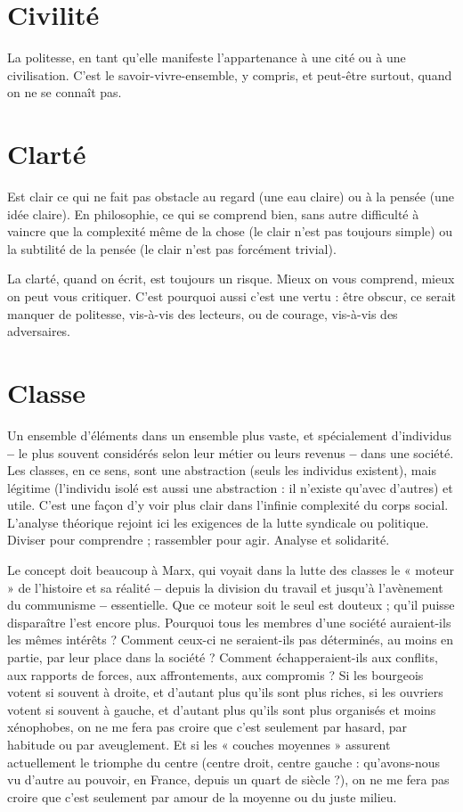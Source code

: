 \section{Civilité}
La politesse, en tant qu’elle manifeste l’appartenance à une cité
ou à une civilisation. C’est le savoir-vivre-ensemble, y compris,
et peut-être surtout, quand on ne se connaît pas.

\section{Clarté}
Est clair ce qui ne fait pas obstacle au regard (une eau claire) ou à
la pensée (une idée claire). En philosophie, ce qui se comprend
bien, sans autre difficulté à vaincre que la complexité même de la chose (le clair
n’est pas toujours simple) ou la subtilité de la pensée (le clair n’est pas forcément trivial).

La clarté, quand on écrit, est toujours un risque. Mieux on vous comprend,
mieux on peut vous critiquer. C’est pourquoi aussi c’est une vertu : être obscur,
ce serait manquer de politesse, vis-à-vis des lecteurs, ou de courage, vis-à-vis des
adversaires.

\section{Classe}
Un ensemble d’éléments dans un ensemble plus vaste, et spécialement
d’individus {\bf --} le plus souvent considérés selon leur métier ou
leurs revenus {\bf --} dans une société. Les classes, en ce sens, sont une abstraction
(seuls les individus existent), mais légitime (l'individu isolé est aussi une
abstraction : il n’existe qu'avec d’autres) et utile. C’est une façon d’y voir plus
clair dans l’infinie complexité du corps social. L'analyse théorique rejoint ici les
exigences de la lutte syndicale ou politique. Diviser pour comprendre ; rassembler
pour agir. Analyse et solidarité.

Le concept doit beaucoup à Marx, qui voyait dans la lutte des classes le
« moteur » de l’histoire et sa réalité {\bf --} depuis la division du travail et jusqu’à
l'avènement du communisme {\bf --} essentielle. Que ce moteur soit le seul est
douteux ; qu’il puisse disparaître l’est encore plus. Pourquoi tous les membres
d’une société auraient-ils les mêmes intérêts ? Comment ceux-ci ne seraient-ils
pas déterminés, au moins en partie, par leur place dans la société ? Comment
échapperaient-ils aux conflits, aux rapports de forces, aux affrontements, aux
compromis ? Si les bourgeois votent si souvent à droite, et d’autant plus qu’ils
sont plus riches, si les ouvriers votent si souvent à gauche, et d’autant plus
qu’ils sont plus organisés et moins xénophobes, on ne me fera pas croire que
c’est seulement par hasard, par habitude ou par aveuglement. Et si les « couches
moyennes » assurent actuellement le triomphe du centre (centre droit, centre
gauche : qu’avons-nous vu d’autre au pouvoir, en France, depuis un quart de
siècle ?), on ne me fera pas croire que c’est seulement par amour de la moyenne
ou du juste milieu.

